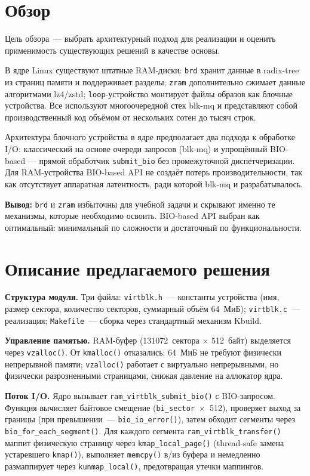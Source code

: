\documentclass[a4paper]{article}
\begin{document}
\section{Обзор}

Цель обзора~--- выбрать архитектурный подход для реализации и оценить
применимость существующих решений в качестве основы.

В ядре Linux существуют штатные RAM-диски: \texttt{brd} хранит данные
в radix-tree из страниц памяти и поддерживает разделы; \texttt{zram} дополнительно
сжимает данные алгоритмами lz4/zstd; \texttt{loop}-устройство монтирует файлы
образов как блочные устройства. Все используют многоочередной стек blk-mq и
представляют собой производственный код объёмом от нескольких сотен до тысяч строк.

Архитектура блочного устройства в ядре предполагает два подхода к обработке I/O:
классический на основе очереди запросов (blk-mq) и упрощённый BIO-based --- прямой
обработчик \texttt{submit\_bio} без промежуточной диспетчеризации.
Для RAM-устройства BIO-based API не создаёт потерь производительности, так как отсутствует
аппаратная латентность, ради которой blk-mq и разрабатывалось.

\textbf{Вывод:} \texttt{brd} и \texttt{zram} избыточны для учебной задачи и
скрывают именно те механизмы, которые необходимо освоить. BIO-based API выбран
как оптимальный: минимальный по сложности и достаточный по функциональности.

\section{Описание предлагаемого решения}

\textbf{Структура модуля.} Три файла: \texttt{virtblk.h}~--- константы устройства
(имя, размер сектора, количество секторов, суммарный объём 64~МиБ); \texttt{virtblk.c}~---
реализация; \texttt{Makefile}~--- сборка через стандартный механизм Kbuild.

\textbf{Управление памятью.} RAM-буфер (131072~сектора $\times$ 512~байт) выделяется
через \texttt{vzalloc()}. От \texttt{kmalloc()} отказались: 64~МиБ не требуют
физически непрерывной памяти; \texttt{vzalloc()} работает с виртуально
непрерывными, но физически разрозненными страницами, снижая давление на аллокатор ядра.

\textbf{Поток I/O.} Ядро вызывает \texttt{ram\_virtblk\_submit\_bio()}
с BIO-запросом. Функция вычисляет байтовое смещение (\texttt{bi\_sector}~$\times$~512),
проверяет выход за границы (при превышении~--- \texttt{bio\_io\_error()}), затем
обходит сегменты через \texttt{bio\_for\_each\_segment()}. Для каждого сегмента
\texttt{ram\_virtblk\_transfer()} маппит физическую страницу через
\texttt{kmap\_local\_page()} (thread-safe замена устаревшего \texttt{kmap()}),
выполняет \texttt{memcpy()} в/из буфера и немедленно размаппирует через
\texttt{kunmap\_local()}, предотвращая утечки маппингов.
\end{document}
